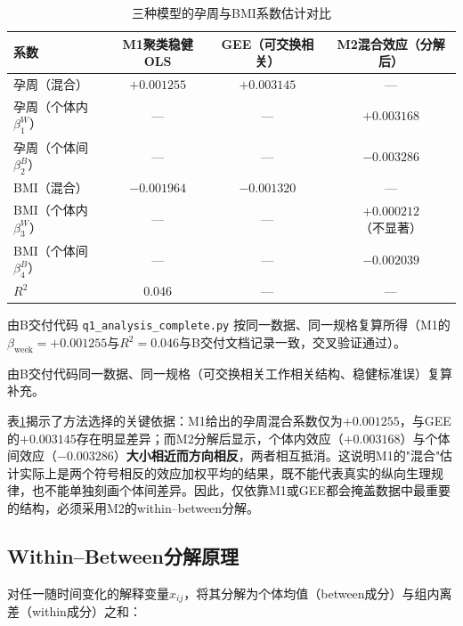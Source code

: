 \documentclass[12pt,a4paper]{ctexart}
\begin{document}
\begin{table}[htbp]
\centering
\caption{三种模型的孕周与BMI系数估计对比}
\label{tab:mcompare}
\begin{threeparttable}
\begin{tabular}{lccc}
\toprule
系数 & M1聚类稳健OLS & GEE（可交换相关） & M2混合效应（分解后） \\
\midrule
孕周（混合） & $+0.001255$\tnote{a} & $+0.003145$\tnote{b} & --- \\
孕周（个体内$\beta_1^W$） & --- & --- & $\mathbf{+0.003168}$ \\
孕周（个体间$\beta_2^B$） & --- & --- & $\mathbf{-0.003286}$ \\
BMI（混合） & $-0.001964$\tnote{a} & $-0.001320$\tnote{b} & --- \\
BMI（个体内$\beta_3^W$） & --- & --- & $+0.000212$（不显著） \\
BMI（个体间$\beta_4^B$） & --- & --- & $\mathbf{-0.002039}$ \\
$R^2$ & 0.046 & --- & --- \\
\bottomrule
\end{tabular}
\begin{tablenotes}
\item[a] 由B交付代码 \texttt{q1\_analysis\_complete.py} 按同一数据、同一规格复算所得（M1的$\beta_{\mathrm{week}}=+0.001255$与$R^2=0.046$与B交付文档记录一致，交叉验证通过）。
\item[b] 由B交付代码同一数据、同一规格（可交换相关工作相关结构、稳健标准误）复算补充。
\end{tablenotes}
\end{threeparttable}
\end{table}

表\ref{tab:mcompare}揭示了方法选择的关键依据：M1给出的孕周混合系数仅为$+0.001255$，与GEE的$+0.003145$存在明显差异；而M2分解后显示，个体内效应（$+0.003168$）与个体间效应（$-0.003286$）\textbf{大小相近而方向相反}，两者相互抵消。这说明M1的"混合"估计实际上是两个符号相反的效应加权平均的结果，既不能代表真实的纵向生理规律，也不能单独刻画个体间差异。因此，仅依靠M1或GEE都会掩盖数据中最重要的结构，必须采用M2的within--between分解。

\subsection{Within--Between分解原理}

对任一随时间变化的解释变量$x_{ij}$，将其分解为个体均值（between成分）与组内离差（within成分）之和：
\end{document}
